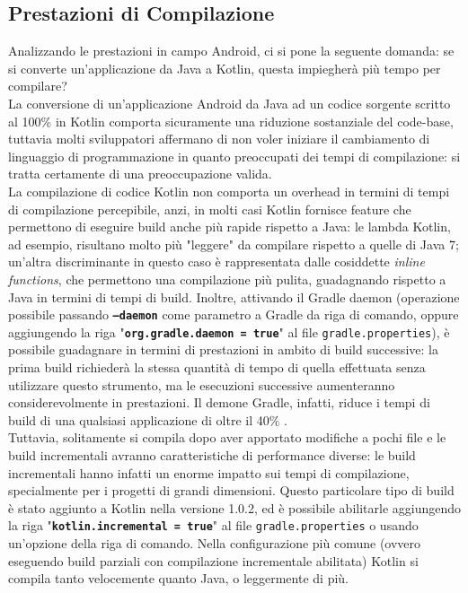 \subsection{Prestazioni di Compilazione}
Analizzando le prestazioni in campo Android, ci si pone la seguente domanda: se si converte un'applicazione da Java a Kotlin, questa impiegherà più tempo per compilare?\\
La conversione di un'applicazione Android da Java ad un codice sorgente scritto al 100\% in Kotlin comporta sicuramente una riduzione sostanziale del code-base, tuttavia molti sviluppatori affermano di non voler iniziare il cambiamento di linguaggio di programmazione in quanto preoccupati dei tempi di compilazione: si tratta certamente di una preoccupazione valida.\\
La compilazione di codice Kotlin non comporta un overhead in termini di tempi di compilazione percepibile, anzi, in molti casi Kotlin fornisce feature che permettono di eseguire build anche più rapide rispetto a Java: le lambda Kotlin, ad esempio, risultano molto più "leggere" da compilare rispetto a quelle di Java 7; un'altra discriminante in questo caso è rappresentata dalle cosiddette {\em inline functions}, che permettono una compilazione più pulita, guadagnando rispetto a Java in termini di tempi di build. Inoltre, attivando il Gradle daemon (operazione possibile passando {\bfseries \texttt{--daemon}} come parametro a Gradle da riga di comando, oppure aggiungendo la riga "{\bfseries \texttt{org.gradle.daemon = true}}" al file \texttt{gradle.properties}), è possibile guadagnare in termini di prestazioni in ambito di build successive: la prima build richiederà la stessa quantità di tempo di quella effettuata senza utilizzare questo strumento, ma le esecuzioni successive aumenteranno considerevolmente in prestazioni. Il demone Gradle, infatti, riduce i tempi di build di una qualsiasi applicazione di oltre il 40\% \cite{ktVsJavaCompilationSpeed}.\\
Tuttavia, solitamente si compila dopo aver apportato modifiche a pochi file e le build incrementali avranno caratteristiche di performance diverse: le build incrementali hanno infatti un enorme impatto sui tempi di compilazione, specialmente per i progetti di grandi dimensioni.
Questo particolare tipo di build è stato aggiunto a Kotlin nella versione 1.0.2, ed è possibile abilitarle aggiungendo la riga "{\bfseries \texttt{kotlin.incremental = true}}" al file \texttt{gradle.properties} o usando un'opzione della riga di comando. Nella configurazione più comune (ovvero eseguendo build parziali con compilazione incrementale abilitata) Kotlin si compila tanto velocemente quanto Java, o leggermente di più.\\

